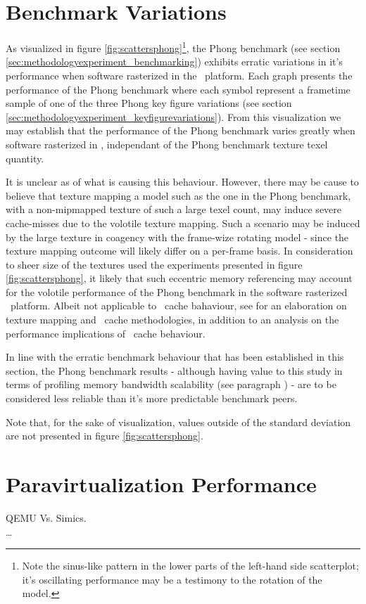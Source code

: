 \section{Benchmark Variations}
\label{sec:analysisexperiment_benchmarkvariations}
As visualized in figure \ref{fig:scattersphong}\footnote{Note the sinus-like pattern in the lower parts of the left-hand side scatterplot; it's oscillating performance may be a testimony to the rotation of the model.}, the Phong benchmark (see section \ref{sec:methodologyexperiment_benchmarking}) exhibits erratic variations in it's performance when software rasterized in the \dvttermsimics\ platform.
Each graph presents the performance of the Phong benchmark where each symbol represent a frametime sample of one of the three Phong key figure variations (see section \ref{sec:methodologyexperiment_keyfigurevariations}).
From this visualization we may establish that the performance of the Phong benchmark varies greatly when software rasterized in \dvttermsimics , independant of the Phong benchmark texture texel quantity.

It is unclear as of what is causing this behaviour.
However, there may be cause to believe that texture mapping a model such as the one in the Phong benchmark, with a non-mipmapped texture of such a large texel count, may induce severe cache-misses due to the volotile texture mapping.
Such a scenario may be induced by the large texture in coagency with the frame-wize rotating model - since the texture mapping outcome will likely differ on a per-frame basis.
In consideration to sheer size of the textures used the experiments presented in figure \ref{fig:scattersphong}, it likely that such eccentric memory referencing may account for the volotile performance of the Phong benchmark in the software rasterized \dvttermsimics\ platform.
Albeit not applicable to \dvttermcpu\ cache bahaviour, see  for an elaboration on texture mapping and \dvttermgpu\ cache methodologies, in addition to an analysis on the performance implications of \dvttermgpu\ cache behaviour.

In line with the erratic benchmark behaviour that has been established in this section, the Phong benchmark results - although having value to this study in terms of profiling memory bandwidth scalability (see paragraph ) - are to be considered less reliable than it's more predictable benchmark peers.

\noindent
Note that, for the sake of visualization, values outside of the standard deviation are not presented in figure \ref{fig:scattersphong}.




\section{Paravirtualization Performance}
\label{sec:analysisexperiment_paravirtualizationperformance}
QEMU Vs. Simics.\\
\ldots
